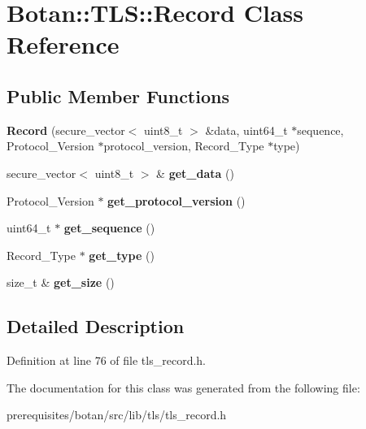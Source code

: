 \hypertarget{class_botan_1_1_t_l_s_1_1_record}{}\section{Botan\+:\+:T\+LS\+:\+:Record Class Reference}
\label{class_botan_1_1_t_l_s_1_1_record}
\subsection*{Public Member Functions}
\begin{DoxyCompactItemize}
\item 
\mbox{\label{class_botan_1_1_t_l_s_1_1_record_a83102fdb666d43acc252e262f18c7f6c}} 
{\bfseries Record} (secure\+\_\+vector$<$ uint8\+\_\+t $>$ \&data, uint64\+\_\+t $\ast$sequence, Protocol\+\_\+\+Version $\ast$protocol\+\_\+version, Record\+\_\+\+Type $\ast$type)
\item 
\mbox{\label{class_botan_1_1_t_l_s_1_1_record_aa81bbdb3b84ef68a576e57f63ca7fd5a}} 
secure\+\_\+vector$<$ uint8\+\_\+t $>$ \& {\bfseries get\+\_\+data} ()
\item 
\mbox{\label{class_botan_1_1_t_l_s_1_1_record_a95eb61057323103bc2dbfcb5aa37ccdd}} 
Protocol\+\_\+\+Version $\ast$ {\bfseries get\+\_\+protocol\+\_\+version} ()
\item 
\mbox{\label{class_botan_1_1_t_l_s_1_1_record_a87f7adbe6774240c195baa5afd27ca82}} 
uint64\+\_\+t $\ast$ {\bfseries get\+\_\+sequence} ()
\item 
\mbox{\label{class_botan_1_1_t_l_s_1_1_record_a18c6ee545a3948aea4af69d3bc460133}} 
Record\+\_\+\+Type $\ast$ {\bfseries get\+\_\+type} ()
\item 
\mbox{\label{class_botan_1_1_t_l_s_1_1_record_ae9a6459e4ddf1af923ba5208d8edc648}} 
size\+\_\+t \& {\bfseries get\+\_\+size} ()
\end{DoxyCompactItemize}


\subsection{Detailed Description}


Definition at line 76 of file tls\+\_\+record.\+h.



The documentation for this class was generated from the following file\+:\begin{DoxyCompactItemize}
\item 
prerequisites/botan/src/lib/tls/tls\+\_\+record.\+h\end{DoxyCompactItemize}
